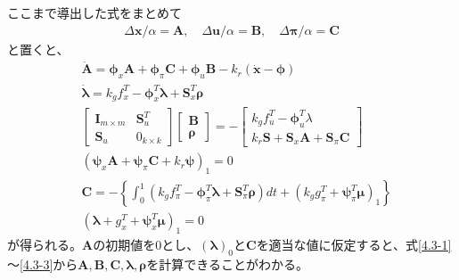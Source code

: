 \documentclass[a4paper]{bxjsarticle}
\begin{document}
	ここまで導出した式をまとめて
	\begin{align}
		\Delta \bm{x}/\alpha = \bm{A}, \quad	\Delta \bm{u} /\alpha= \bm{B}, \quad	\Delta \bm{\pi} /\alpha= \bm{C}
	\end{align}
	と置くと、
	\begin{align}
		&\dot{\bm{A}} = \bm{\phi}_x \bm{A}  + \bm{\phi}_\pi  \bm{C}+\bm{\phi}_u \bm{B} - k_r (\dot{\bm{x}} - \bm{\phi} ) \label{4.3-1}\\
		&\dot{\bm{\lambda}} = k_g f_x^T - \bm{\phi}^T_x \bm{\lambda}  + \bm{S}_x^T \bm{\rho} \label{4.3-2} \\
		&\begin{bmatrix}
		\bm{I}_{m\times m}& \bm{S}_u^T\\ 
		\bm{S}_u&  0_{k\times k}
		\end{bmatrix} \begin{bmatrix}
		\bm{B}\\ 
		\bm{\rho}
		\end{bmatrix} = - \begin{bmatrix}
		k_gf_u^T -\bm{\phi}_u^T \lambda\\ 
		k_r \bm{S} + \bm{S}_x \bm{A} + \bm{S}_\pi \bm{C}
		\end{bmatrix}  \label{4.3-3}\\
		&(\bm{\psi}_x \bm{A} + \bm{\psi}_\pi \bm{C} + k_r\bm{\psi})_1 = 0 \label{4.3-4}\\
		&\bm{C} = -\left\{ \int_{0}^{1}(k_g f_\pi^T - \bm{\phi}_\pi^T \bm{\lambda} + \bm{S}_\pi^T \bm{\rho})dt + (k_g g_\pi^T + \bm{\psi}_\pi^T \bm{\mu})_1  \right\}\\
		&(\bm{\lambda} + g_x^T + \bm{\psi}_x^T \bm{\mu})_1  = 0 \label{4.3-6}
	\end{align}
	が得られる。$\bm{A}$の初期値を0とし、$(\bm{\lambda})_0$と$\bm{C}$を適当な値に仮定すると、式\eqref{4.3-1}～\eqref{4.3-3}から$\bm{A},\bm{B},\bm{C},\bm{\lambda},\bm{\rho}$を計算できることがわかる。
	
\end{document}
